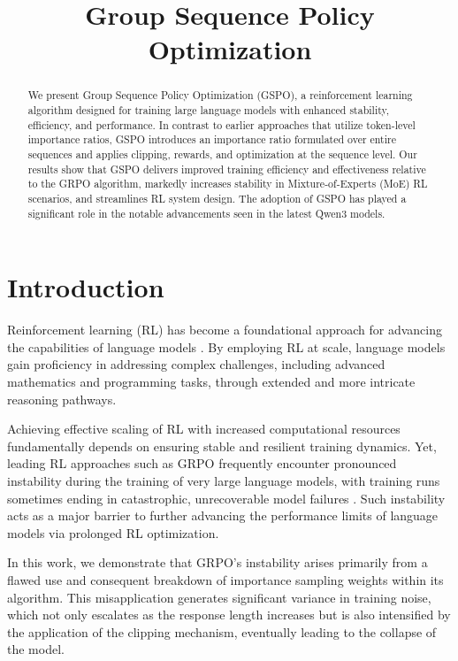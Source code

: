 \title{Group Sequence Policy Optimization}

\begin{abstract}
We present Group Sequence Policy Optimization (GSPO), a reinforcement learning algorithm designed for training large language models with enhanced stability, efficiency, and performance. In contrast to earlier approaches that utilize token-level importance ratios, GSPO introduces an importance ratio formulated over entire sequences and applies clipping, rewards, and optimization at the sequence level. Our results show that GSPO delivers improved training efficiency and effectiveness relative to the GRPO algorithm, markedly increases stability in Mixture-of-Experts (MoE) RL scenarios, and streamlines RL system design. The adoption of GSPO has played a significant role in the notable advancements seen in the latest Qwen3 models.
\end{abstract}

\section{Introduction}
\label{sec:intro}

Reinforcement learning (RL) has become a foundational approach for advancing the capabilities of language models \citep{o1,dpsk-r1,qwq32b,qwen3}. By employing RL at scale, language models gain proficiency in addressing complex challenges, including advanced mathematics and programming tasks, through extended and more intricate reasoning pathways.

Achieving effective scaling of RL with increased computational resources fundamentally depends on ensuring stable and resilient training dynamics. Yet, leading RL approaches such as GRPO \citep{grpo} frequently encounter pronounced instability during the training of very large language models, with training runs sometimes ending in catastrophic, unrecoverable model failures \citep{qwen3, minimax-m1}. Such instability acts as a major barrier to further advancing the performance limits of language models via prolonged RL optimization.

In this work, we demonstrate that GRPO's instability arises primarily from a flawed use and consequent breakdown of importance sampling weights within its algorithm. This misapplication generates significant variance in training noise, which not only escalates as the response length increases but is also intensified by the application of the clipping mechanism, eventually leading to the collapse of the model.

